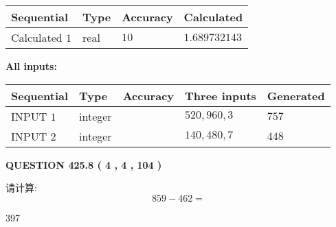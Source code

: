 \documentclass{ctexart}
\begin{document}
   
   
   
\noindent{}
   
   
  
  
\noindent\begin{tabular}{|l|l|l|l|}
\hline
 Sequential & Type & Accuracy & Calculated \\ 
\hline
 
 
  Calculated $  1 $ & real & $  10  $ & 
 $ 1.689732143 $ 
 \\  \hline  
 \end{tabular}
   
   
   
   
\noindent\vspace{0.1in}\hspace{-0.08in} {\textbf{\Large{All inputs: }}}
   
   
  
  
\noindent\begin{tabular}{|l|l|l|l|l|}
\hline
 Sequential & Type & Accuracy & Three inputs & Generated \\ 
\hline
 
 
  INPUT $  1 $ & integer &  & $
 520
 , 
 960
 , 
 3
 $ & $ 757 $ 
 \\  \hline  
 
 
  INPUT $  2 $ & integer &  & $
 140
 , 
 480
 , 
 7
 $ & $ 448 $ 
 \\  \hline  
 \end{tabular}
   
   
  
\vspace{0.2in}
  
{\textbf{\Large{QUESTION
425.8 
 ( 4 , 4 , 104 )
}}}
  
  
 
请计算:
\begin{equation}
859 -   %
462 = \nonumber
\end{equation}
 
 
 
\noindent{}
 
 

397
 
 
\noindent{}
 
 

 
 
 
\noindent{}
 
\end{document}
